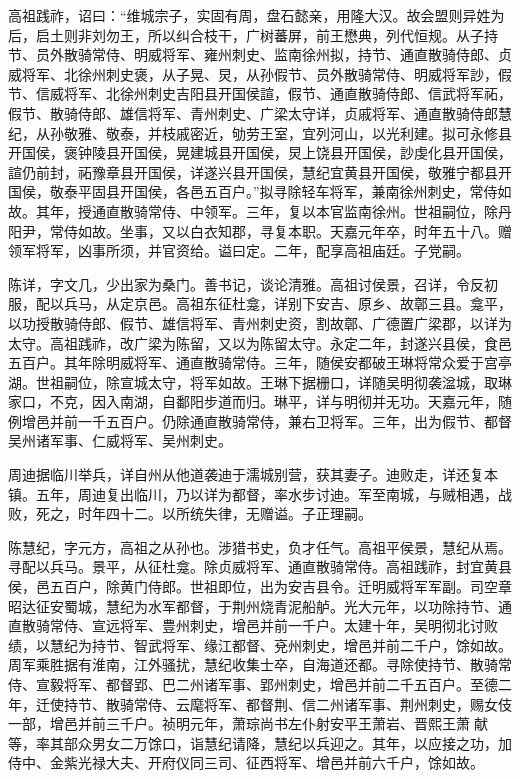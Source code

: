\documentclass[]{article}
\begin{document}
高祖践祚，诏曰：``维城宗子，实固有周，盘石懿亲，用隆大汉。故会盟则异姓为后，启土则非刘勿王，所以纠合枝干，广树蕃屏，前王懋典，列代恒规。从子持节、员外散骑常侍、明威将军、雍州刺史、监南徐州拟，持节、通直散骑侍郎、贞威将军、北徐州刺史褒，从子晃、炅，从孙假节、员外散骑常侍、明威将军訬，假节、信威将军、北徐州刺史吉阳县开国侯諠，假节、通直散骑侍郎、信武将军祏，假节、散骑侍郎、雄信将军、青州刺史、广梁太守详，贞戚将军、通直散骑侍郎慧纪，从孙敬雅、敬泰，并枝戚密近，劬劳王室，宜列河山，以光利建。拟可永修县开国侯，褒钟陵县开国侯，晃建城县开国侯，炅上饶县开国侯，訬虔化县开国侯，諠仍前封，祏豫章县开国侯，详遂兴县开国侯，慧纪宜黄县开国侯，敬雅宁都县开国侯，敬泰平固县开国侯，各邑五百户。''拟寻除轻车将军，兼南徐州刺史，常侍如故。其年，授通直散骑常侍、中领军。三年，复以本官监南徐州。世祖嗣位，除丹阳尹，常侍如故。坐事，又以白衣知郡，寻复本职。天嘉元年卒，时年五十八。赠领军将军，凶事所须，并官资给。谥曰定。二年，配享高祖庙廷。子党嗣。

陈详，字文几，少出家为桑门。善书记，谈论清雅。高祖讨侯景，召详，令反初服，配以兵马，从定京邑。高祖东征杜龛，详别下安吉、原乡、故鄣三县。龛平，以功授散骑侍郎、假节、雄信将军、青州刺史资，割故鄣、广德置广梁郡，以详为太守。高祖践祚，改广梁为陈留，又以为陈留太守。永定二年，封遂兴县侯，食邑五百户。其年除明威将军、通直散骑常侍。三年，随侯安都破王琳将常众爱于宫亭湖。世祖嗣位，除宣城太守，将军如故。王琳下据栅口，详随吴明彻袭湓城，取琳家口，不克，因入南湖，自鄱阳步道而归。琳平，详与明彻并无功。天嘉元年，随例增邑并前一千五百户。仍除通直散骑常侍，兼右卫将军。三年，出为假节、都督吴州诸军事、仁威将军、吴州刺史。

周迪据临川举兵，详自州从他道袭迪于濡城别营，获其妻子。迪败走，详还复本镇。五年，周迪复出临川，乃以详为都督，率水步讨迪。军至南城，与贼相遇，战败，死之，时年四十二。以所统失律，无赠谥。子正理嗣。

陈慧纪，字元方，高祖之从孙也。涉猎书史，负才任气。高祖平侯景，慧纪从焉。寻配以兵马。景平，从征杜龛。除贞威将军、通直散骑常侍。高祖践祚，封宜黄县侯，邑五百户，除黄门侍郎。世祖即位，出为安吉县令。迁明威将军军副。司空章昭达征安蜀城，慧纪为水军都督，于荆州烧青泥船舻。光大元年，以功除持节、通直散骑常侍、宣远将军、豊州刺史，增邑并前一千户。太建十年，吴明彻北讨败绩，以慧纪为持节、智武将军、缘江都督、兗州刺史，增邑并前二千户，馀如故。周军乘胜据有淮南，江外骚扰，慧纪收集士卒，自海道还都。寻除使持节、散骑常侍、宣毅将军、都督郢、巴二州诸军事、郢州刺史，增邑并前二千五百户。至德二年，迁使持节、散骑常侍、云麾将军、都督荆、信二州诸军事、荆州刺史，赐女伎一部，增邑并前三千户。祯明元年，萧琮尚书左仆射安平王萧岩、晋熙王萧献等，率其部众男女二万馀口，诣慧纪请降，慧纪以兵迎之。其年，以应接之功，加侍中、金紫光禄大夫、开府仪同三司、征西将军、增邑并前六千户，馀如故。
\end{document}
